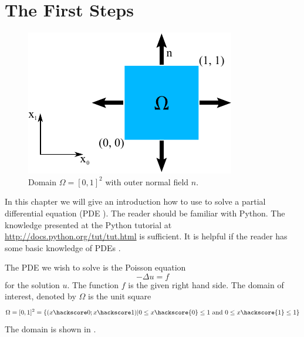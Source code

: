 %
%


\section{The First Steps}
\label{FirstSteps} 

\begin{figure}
\centerline{\includegraphics[width=\figwidth]{figures/FirstStepDomain}}
\caption{Domain $\Omega=[0,1]^2$ with outer normal field $n$.}
\label{fig:FirstSteps.1}
\end{figure}

In this chapter we will give an introduction how to use \escript to solve 
a partial differential equation  (PDE ). The reader should be familiar with Python. The knowledge presented at the Python tutorial at \url{http://docs.python.org/tut/tut.html}
is sufficient. It is helpful if the reader has some basic knowledge of PDEs .

The PDE  we wish to solve is the Poisson equation  
\begin{equation}
-\Delta u =f 
\label{eq:FirstSteps.1}
\end{equation}
for the solution $u$. The function $f$ is the given right hand side. The domain of interest, denoted by $\Omega$
is the unit square 
\begin{equation}
\Omega=[0,1]^2=\{ (x\hackscore 0;x\hackscore 1) | 0\le x\hackscore{0} \le 1 \mbox{ and } 0\le x\hackscore{1} \le 1 \}
\label{eq:FirstSteps.1b}
\end{equation}
The domain is shown in .

